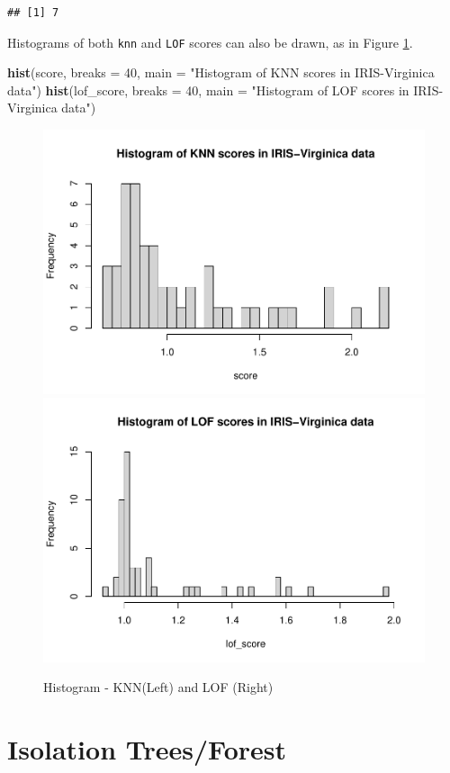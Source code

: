 \documentclass[
]{book}
\newenvironment{Shaded}{\begin{snugshade}}{\end{snugshade}}
\newcommand{\AttributeTok}[1]{\textcolor[rgb]{0.13,0.29,0.53}{#1}}
\newcommand{\DecValTok}[1]{\textcolor[rgb]{0.00,0.00,0.81}{#1}}
\newcommand{\FunctionTok}[1]{\textcolor[rgb]{0.13,0.29,0.53}{\textbf{#1}}}
\newcommand{\NormalTok}[1]{#1}
\newcommand{\StringTok}[1]{\textcolor[rgb]{0.31,0.60,0.02}{#1}}
\begin{document}
\begin{verbatim}
## [1] 7
\end{verbatim}

Histograms of both \texttt{knn} and \texttt{LOF} scores can also be drawn, as in Figure \ref{fig:an12}.

\begin{Shaded}
\begin{Highlighting}[]
\FunctionTok{hist}\NormalTok{(score, }\AttributeTok{breaks =} \DecValTok{40}\NormalTok{, }
     \AttributeTok{main =} \StringTok{"Histogram of KNN scores in IRIS{-}Virginica data"}\NormalTok{)}
\FunctionTok{hist}\NormalTok{(lof\_score, }\AttributeTok{breaks =} \DecValTok{40}\NormalTok{, }
     \AttributeTok{main =} \StringTok{"Histogram of LOF scores in IRIS{-}Virginica data"}\NormalTok{)}
\end{Highlighting}
\end{Shaded}

\begin{figure}

{\centering \includegraphics[width=0.48\linewidth]{DauR_files/figure-latex/an12-1} \includegraphics[width=0.48\linewidth]{DauR_files/figure-latex/an12-2} 

}

\caption{Histogram - KNN(Left) and LOF (Right)}\label{fig:an12}
\end{figure}

\hypertarget{isolation-treesforest}{%
\section{Isolation Trees/Forest}\label{isolation-treesforest}}
\end{document}
